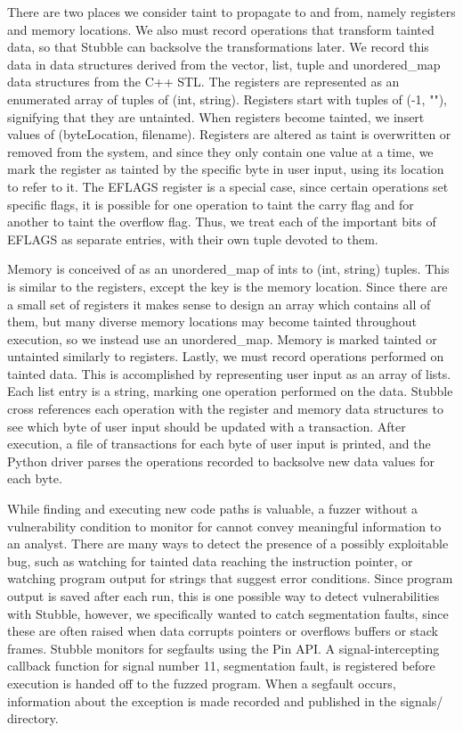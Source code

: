 \documentclass[11pt,expanded,copyright]{fsuthesis}
\begin{document}
There are two places we consider taint to propagate to and from, namely registers and memory locations. We also must record operations that transform tainted data, so that Stubble can backsolve the transformations later. We record this data in data structures derived from the vector, list, tuple and unordered\_map data structures from the C++ STL. The registers are represented as an enumerated array of tuples of (int, string). Registers start with tuples of (-1, ""), signifying that they are untainted. When registers become tainted, we insert values of (byteLocation, filename). Registers are altered as taint is overwritten or removed from the system, and since they only contain one value at a time, we mark the register as tainted by the specific byte in user input, using its location to refer to it. The EFLAGS register is a special case, since certain operations set specific flags, it is possible for one operation to taint the carry flag and for another to taint the overflow flag. Thus, we treat each of the important bits of EFLAGS as separate entries, with their own tuple devoted to them.

Memory is conceived of as an unordered\_map of ints to (int, string) tuples. This is similar to the registers, except the key is the memory location. Since there are a small set of registers it makes sense to design an array which contains all of them, but many diverse memory locations may become tainted throughout execution, so we instead use an unordered\_map. Memory is marked tainted or untainted similarly to registers. Lastly, we must record operations performed on tainted data. This is accomplished by representing user input as an array of lists. Each list entry is a string, marking one operation performed on the data. Stubble cross references each operation with the register and memory data structures to see which byte of user input should be updated with a transaction. After execution, a file of transactions for each byte of user input is printed, and the Python driver parses the operations recorded to backsolve new data values for each byte.

While finding and executing new code paths is valuable, a fuzzer without a vulnerability condition to monitor for cannot convey meaningful information to an analyst. There are many  ways to detect the presence of a possibly exploitable bug, such as watching for tainted data reaching the instruction pointer, or watching program output for strings that suggest error conditions. Since program output is saved after each run, this is one possible way to detect vulnerabilities with Stubble, however, we specifically wanted to catch segmentation faults, since these are often raised when data corrupts pointers or overflows buffers or stack frames. Stubble monitors for segfaults using the Pin API. A signal-intercepting callback function for signal number 11, segmentation fault, is registered before execution is handed off to the fuzzed program. When a segfault occurs, information about the exception is made recorded and published in the signals/ directory.
\end{document}
